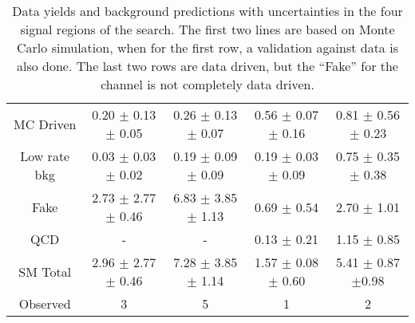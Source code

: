 \begin{table}[!Hhtb]
\begin{center}
\begin{tabular}{|c|c|c|c|c|}
\hline
\hline
		& \eTau & \muTau & \tauTau \binone & \tauTau \bintwo \\
\hline
MC Driven    & 0.20 $\pm$ 0.13 $\pm$ 0.05 & 0.26 $\pm$ 0.13  $\pm$ 0.07  &  0.56 $\pm$ 0.07 $\pm$ 0.16 & 0.81 $\pm$ 0.56 $\pm$ 0.23  \\
Low rate bkg & 0.03 $\pm$ 0.03 $\pm$ 0.02 & 0.19 $\pm$ 0.09  $\pm$ 0.09  &  0.19 $\pm$ 0.03 $\pm$ 0.09 & 0.75 $\pm$ 0.35 $\pm$ 0.38  \\
Fake         & 2.73 $\pm$ 2.77 $\pm$ 0.46 & 6.83 $\pm$ 3.85  $\pm$ 1.13  &     0.69 $\pm$ 0.54         &         2.70 $\pm$ 1.01     \\
QCD          &             -              &            -                 &     0.13 $\pm$ 0.21         &         1.15 $\pm$ 0.85     \\
\hline
SM Total     & 2.96 $\pm$ 2.77 $\pm$ 0.46 & 7.28 $\pm$ 3.85  $\pm$ 1.14  & 1.57 $\pm$ 0.08 $\pm$ 0.60  & 5.41  $\pm$ 0.87 $\pm$0.98  \\
\hline
\hline
Observed     &               3            &                5             &             1               & 2     \\  
\hline
\hline
\end{tabular}
\caption{Data yields and background predictions with uncertainties in the four signal regions of the search. The first two lines are based on 
Monte Carlo simulation, when for the first row, a validation against data is also done. The last two rows are data driven, but the 
``Fake'' for the \tauTau channel is not completely data driven.
}
\label{tbl:yieldSysSummary}
\end{center}
\end{table}
